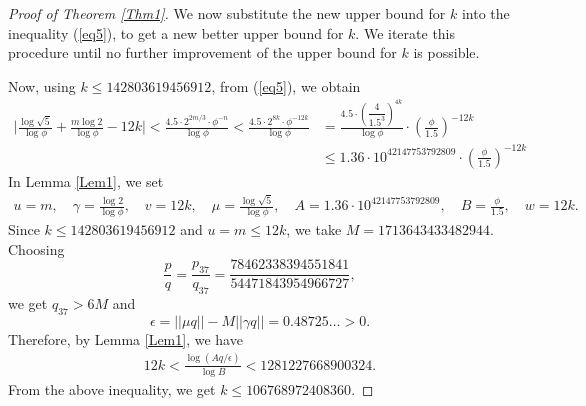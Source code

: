 \documentclass[10pt,a4paper]{amsart}
\begin{document}
\begin{proof}[Proof of Theorem \ref{Thm1}]
We now substitute the new upper bound for $k$ into the inequality (\ref{eq5}), to get a new better upper bound for $k$. We iterate this procedure until no further improvement of the upper bound for $k$ is possible.

Now, using $k\leq 142803619456912$, from (\ref{eq5}), we obtain
\begin{align*}
\bigg|\frac{\log\sqrt{5}}{\log\phi}+\frac{m\log2}{\log\phi}-12k\bigg|<\frac{4.5\cdot 2^{2m/3}\cdot\phi^{-n}}{\log\phi}<\frac{4.5\cdot 2^{8k}\cdot\phi^{-{12k}}}{\log\phi}&=\frac{4.5\cdot (\dfrac{4}{1.5^3})^{4k}}{\log\phi}\cdot (\frac{\phi}{1.5})^{-12k}\\
&\leq 1.36\cdot 10^{42147753792809}\cdot (\frac{\phi}{1.5})^{-12k} 
\end{align*}
In Lemma \ref{Lem1}, we set
\begin{align*}
    u=m,\quad \gamma=\frac{\log2}{\log \phi},\quad v=12k,\quad \mu=\frac{\log\sqrt{5}}{\log \phi},\quad A=1.36\cdot 10^{42147753792809},\quad B=\frac{\phi}{1.5},\quad w=12k.
\end{align*}
Since $k\leq 142803619456912$ and $u=m\leq 12k$, we take $M=1713643433482944$. Choosing  
$$\frac{p}{q}=\frac{p_{37}}{q_{37}}=\frac{78462338394551841}{54471843954966727},$$
we get $q_{37}>6M$ and
$$\epsilon=||\mu q||-M||\gamma q||=0.48725\ldots>0.$$
Therefore, by Lemma \ref{Lem1}, we have
\begin{align*}
    12k<\frac{\log(Aq/\epsilon)}{\log B}<1281227668900324.
\end{align*}
From the above inequality, we get $k\leq 106768972408360$. 


\end{proof}
\end{document}
